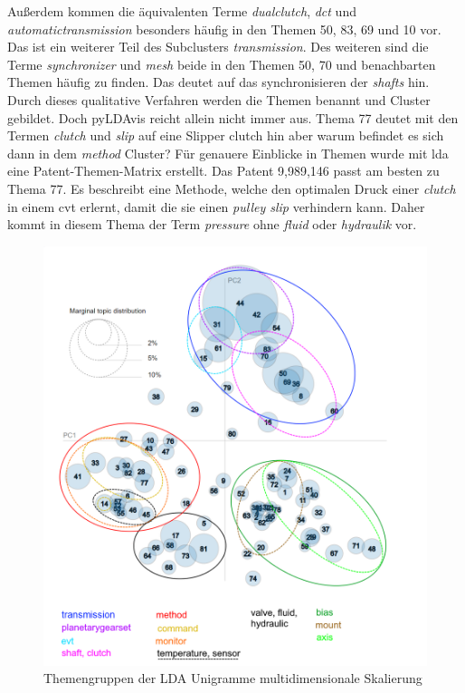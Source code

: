  
Außerdem kommen die äquivalenten Terme \emph{dualclutch}, \emph{dct} und \emph{automatictransmission} besonders häufig in den Themen 50, 83, 69 und 10 vor. Das ist ein weiterer Teil des Subclusters \emph{transmission}. Des weiteren sind die Terme \emph{synchronizer} und \emph{mesh} beide in den Themen 50, 70 und benachbarten Themen häufig zu finden. Das deutet auf das synchronisieren der \emph{shafts} hin. Durch dieses qualitative Verfahren werden die Themen benannt und Cluster gebildet. Doch \gls{pyLDAvis} reicht allein nicht immer aus. Thema 77 deutet mit den Termen \emph{clutch} und \emph{slip} auf eine Slipper clutch hin aber warum befindet es sich dann in dem \emph{method} Cluster? Für genauere Einblicke in Themen wurde mit \gls{lda} eine Patent-Themen-Matrix erstellt. Das Patent 9,989,146 passt am besten zu Thema 77. Es beschreibt eine Methode, welche den optimalen Druck einer \emph{clutch} in einem \gls{cvt} erlernt, damit die sie einen \emph{pulley slip} verhindern kann. Daher kommt in diesem Thema der Term \emph{pressure} ohne \emph{fluid} oder \emph{hydraulik} vor.
 
 \begin{figure}[htpb]
 	\centering
 	\includegraphics[width=\textwidth,keepaspectratio=true]{img/LDAvisGM-3-1-1_clustered.png}
 	\caption{
 		Themengruppen der LDA Unigramme multidimensionale Skalierung
 	}
 	\label{fig:Themengruppen_LDA_Unigramm}
 \end{figure}
 
